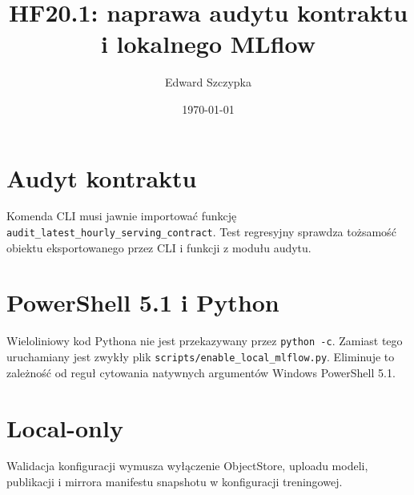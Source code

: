 \documentclass[11pt,a4paper]{article}
\title{HF20.1: naprawa audytu kontraktu i lokalnego MLflow}
\author{Edward Szczypka}
\date{\today}
\begin{document}
\maketitle
\section{Audyt kontraktu}
Komenda CLI musi jawnie importować funkcję
\texttt{audit\_latest\_hourly\_serving\_contract}. Test regresyjny sprawdza
tożsamość obiektu eksportowanego przez CLI i funkcji z modułu audytu.
\section{PowerShell 5.1 i Python}
Wieloliniowy kod Pythona nie jest przekazywany przez \texttt{python -c}.
Zamiast tego uruchamiany jest zwykły plik
\texttt{scripts/enable\_local\_mlflow.py}. Eliminuje to zależność od reguł
cytowania natywnych argumentów Windows PowerShell 5.1.
\section{Local-only}
Walidacja konfiguracji wymusza wyłączenie ObjectStore, uploadu modeli,
publikacji i mirrora manifestu snapshotu w konfiguracji treningowej.
\end{document}
